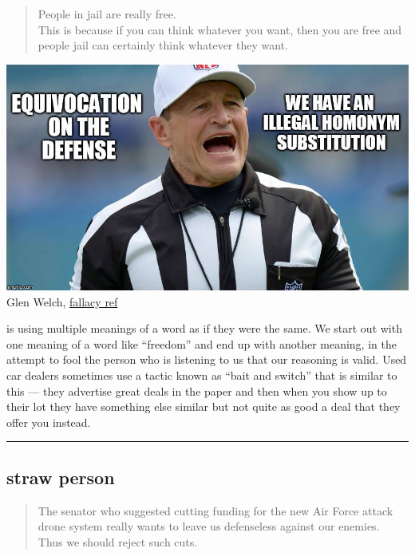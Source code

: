 \documentclass[justified]{tufte-book}
\newenvironment{argument}{\begin{quote}\normalsize}{\end{quote}}
\begin{document}
\begin{argument}
People in jail are really free.\\
This is because if you can think whatever you want, then you are free
and people jail can certainly think whatever they want.
\end{argument}

\begin{marginfigure}
\includegraphics{img/fallacies/equivocation.jpg}\\
Glen Welch, \href{https://twitter.com/fallacy_ref?lang=en}{fallacy ref}
\end{marginfigure}

 is using multiple meanings of a word as if they were the same. We start out with one meaning of a word like ``freedom'' and end up with another meaning, in the attempt to fool the person who is listening to us that our reasoning is valid. Used car dealers sometimes use a tactic known as ``bait and switch'' that is similar to this --- they advertise great deals in the paper and then when you show up to their lot they have something else similar but not quite as good a deal that they offer you instead.

\begin{center}\rule{0.5\linewidth}{\linethickness}\end{center}

\hypertarget{straw-person}{%
\subsection*{straw person}\label{straw-person}}

\begin{argument}
The senator who suggested cutting funding for the new Air Force attack
drone system really wants to leave us defenseless against our enemies.\\
Thus we should reject such cuts.
\end{argument}
\end{document}
